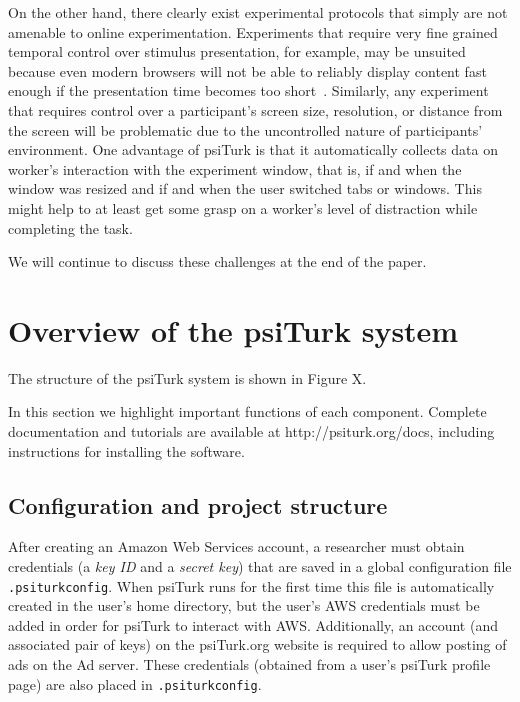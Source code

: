 \documentclass[twocolumn]{svjour3}          %
\begin{document}
On the other hand, there clearly exist experimental protocols that simply are not amenable to online
experimentation. Experiments that require very fine grained temporal control over stimulus presentation, for example, 
may be unsuited because even modern browsers will not be able to reliably display content fast enough if the presentation time
becomes too short~\citep{crump2013evaluating}.
Similarly, any experiment that requires  control over a participant's screen size, resolution, or distance
from the screen will be problematic due to the uncontrolled nature of participants' environment. One advantage of psiTurk is that
it automatically collects data on worker's interaction with the experiment window, that is, if and when the window was resized and
if and when the user switched tabs or windows. This might help to at least get some grasp on a worker's level of distraction while completing
the task. 

We will continue to discuss these challenges at the end of the paper.


\section{Overview of the psiTurk system}

The structure of the psiTurk system is shown in Figure X.

In this section we highlight important functions of each component.
Complete documentation and tutorials are available at http://psiturk.org/docs, including instructions for installing the software.

\subsection{Configuration and project structure}

After creating an Amazon Web Services account, a researcher must obtain credentials (a \emph{key ID} and a \emph{secret key}) that are saved in a global configuration file \texttt{.psiturkconfig}.
When psiTurk runs for the first time this file is automatically created in the user's home directory, but the user's AWS credentials must be added in order for psiTurk to interact with AWS.
Additionally, an account (and associated pair of keys) on the psiTurk.org website is required to allow posting of ads on the Ad server.
These credentials (obtained from a user's psiTurk profile page) are also placed in \texttt{.psiturkconfig}.
\end{document}
